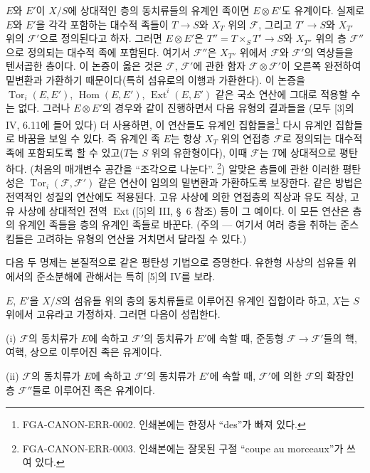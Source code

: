 $E$와 $E'$이 $X/S$에 상대적인 층의 동치류들의 유계인 족이면
$E\otimes E'$도 유계이다. 실제로 $E$와 $E'$을 각각 포함하는 대수적
족들이 $T\longrightarrow S$와 $X_T$ 위의 $\mathcal F$, 그리고
$T'\longrightarrow S$와 $X_{T'}$ 위의 $\mathcal F'$으로 정의된다고
하자. 그러면 $E\otimes E'$은 $T''=T\times_S T'\longrightarrow S$와
$X_{T''}$ 위의 층 $\mathcal F''$으로 정의되는 대수적 족에 포함된다.
여기서 $\mathcal F''$은 $X_{T''}$ 위에서 $\mathcal F$와 $\mathcal F'$의
역상들을 텐서곱한 층이다. 이 논증이 옳은 것은 $\mathcal F$, $\mathcal F'$에
관한 함자 $\mathcal F\otimes\mathcal F'$이 오른쪽 완전하여 밑변환과
가환하기 때문이다(특히 섬유로의 이행과 가환한다). 이 논증을
$\operatorname{Tor}_i(E,E')$, $\operatorname{Hom}(E,E')$,
$\operatorname{Ext}^i(E,E')$ 같은 국소 연산에 그대로 적용할 수는 없다.
그러나 $E\otimes E'$의 경우와 같이 진행하면서 다음 유형의 결과들을
(모두 [3]의 IV, 6.11에 들어 있다) 더 사용하면, 이 연산들도 유계인
집합들을\footnote{FGA-CANON-ERR-0002. 인쇄본에는 한정사 ``des''가
빠져 있다.} 다시 유계인 집합들로 바꿈을 보일 수 있다. 즉 유계인 족 $E$는
항상 $X_T$ 위의 연접층 $\mathcal F$로 정의되는 대수적 족에 포함되도록
할 수 있고($T$는 $S$ 위의 유한형이다), 이때 $\mathcal F$는 $T$에
상대적으로 평탄하다. (처음의 매개변수 공간을 ``조각으로
나눈다''.
\footnote{FGA-CANON-ERR-0003. 인쇄본에는 잘못된 구절 ``coupe au
morceaux''가 쓰여 있다.}) 알맞은 층들에 관한 이러한
평탄성은 $\operatorname{Tor}_i(\mathcal F,\mathcal F')$ 같은 연산이
임의의 밑변환과 가환하도록 보장한다. 같은 방법은 전역적인 성질의 연산에도
적용된다. 고유 사상에 의한 연접층의 직상과 유도 직상, 고유 사상에 상대적인
전역 $\operatorname{Ext}$([5]의 III, \S~6 참조) 등이 그 예이다. 이 모든
연산은 층의 유계인 족들을 층의 유계인 족들로 바꾼다. (주의 --- 여기서
여러 층을 취하는 준스킴들은 고려하는 유형의 연산을 거치면서 달라질 수 있다.)

다음 두 명제는 본질적으로 같은 평탄성 기법으로 증명한다. 유한형 사상의
섬유들 위에서의 준소분해에 관해서는 특히 [5]의 IV를 보라.

 $E$, $E'$을 $X/S$의 섬유들 위의 층의 동치류들로
이루어진 유계인 집합이라 하고, $X$는 $S$ 위에서 고유라고 가정하자. 그러면
다음이 성립한다.

\medskip
\noindent (i) $\mathcal F$의 동치류가 $E$에 속하고 $\mathcal F'$의
동치류가 $E'$에 속할 때, 준동형
$\mathcal F\longrightarrow\mathcal F'$들의 핵, 여핵, 상으로 이루어진
족은 유계이다.

\smallskip
\noindent (ii) $\mathcal F$의 동치류가 $E$에 속하고 $\mathcal F'$의
동치류가 $E'$에 속할 때, $\mathcal F'$에 의한 $\mathcal F$의 확장인
층 $\mathcal F''$들로 이루어진 족은 유계이다.

